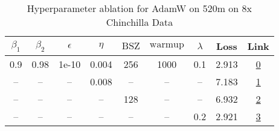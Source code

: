 \begin{table}[H]
\centering
\caption{Hyperparameter ablation for AdamW on 520m on 8x Chinchilla Data}
\label{tab:ablation_adamw_520m_8}
\begin{tabular}{ccccccccc}
\toprule
$\beta_1$ & $\beta_2$ & $\epsilon$ & $\eta$ & $\mathrm{BSZ}$ & $\mathrm{warmup}$ & $\lambda$ & Loss & Link \\
\midrule
0.9 & 0.98 & 1e-10 & 0.004 & 256 & 1000 & 0.1 & 2.913 & \href{https://wandb.ai/stanford-mercury/optimizer-scaling/runs/sweep-520m-85B-adamwf14f39lr0.004-wd0.1-minlr0-warmup1000-b10.9--84afa9}{0} \\
\midrule
-- & -- & -- & 0.008 & -- & -- & -- & 7.183 & \href{https://wandb.ai/stanford-mercury/optimizer-scaling/runs/sweep-520m-85B-adamw166f50lr0.008-wd0.1-minlr0-warmup1000-b10.9--397bf5}{1} \\
-- & -- & -- & -- & 128 & -- & -- & 6.932 & \href{https://wandb.ai/stanford-mercury/optimizer-scaling/runs/sweep-520m-85B-adamw2b7ec2lr0.004-wd0.1-minlr0-warmup1000-b10.9--01c1ad}{2} \\
-- & -- & -- & -- & -- & -- & 0.2 & 2.921 & \href{https://wandb.ai/stanford-mercury/optimizer-scaling/runs/sweep-520m-85B-adamw61633blr0.004-wd0.2-minlr0-warmup1000-b10.9--1a26e3}{3} \\
\bottomrule
\end{tabular}
\end{table}

